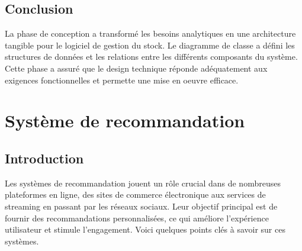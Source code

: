 \documentclass[edit,12pt,a4paper,ChapStyle,oneside,doubleinterligne]{report}
\begin{document}
\section{Conclusion}
La phase de conception a transformé les besoins analytiques en une architecture tangible pour le logiciel de gestion du stock. Le diagramme de classe a défini les structures de données et les relations entre les différents composants du système. Cette phase a assuré que le design technique réponde adéquatement aux exigences fonctionnelles et permette une mise en oeuvre efficace.


\clearpage 
\chapter{Système de recommandation}
\section{Introduction}
Les systèmes de recommandation jouent un rôle crucial dans de nombreuses plateformes en ligne, des sites de commerce électronique aux services de streaming en passant par les réseaux sociaux. Leur objectif principal est de fournir des recommandations personnalisées, ce qui améliore l'expérience utilisateur et stimule l'engagement. Voici quelques points clés à savoir sur ces systèmes.
\end{document}
